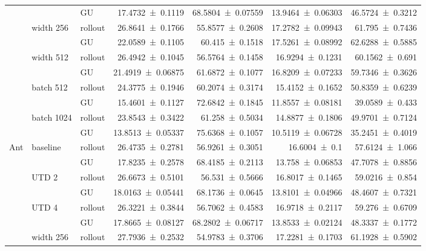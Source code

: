 {\begin{longtable}{@{}lllrrrr@{}}
     &  & GU & \num{17.4732+-0.1119} & \num{68.5804+-0.07559} & \num{13.9464+-0.06303} & \num{46.5724+-0.3212} \\
    \addlinespace[2pt]
     & width 256 & rollout & \num{26.8641+-0.1766} & \num{55.8577+-0.2608} & \num{17.2782+-0.09943} & \num{61.795+-0.7436} \\
     &  & GU & \num{22.0589+-0.1105} & \num{60.415+-0.1518} & \num{17.5261+-0.08992} & \num{62.6288+-0.5885} \\
    \addlinespace[2pt]
     & width 512 & rollout & \num{26.4942+-0.1045} & \num{56.5764+-0.1458} & \num{16.9294+-0.1231} & \num{60.1562+-0.691} \\
     &  & GU & \num{21.4919+-0.06875} & \num{61.6872+-0.1077} & \num{16.8209+-0.07233} & \num{59.7346+-0.3626} \\
    \addlinespace[2pt]
     & batch 512 & rollout & \num{24.3775+-0.1946} & \num{60.2074+-0.3174} & \num{15.4152+-0.1652} & \num{50.8359+-0.6239} \\
     &  & GU & \num{15.4601+-0.1127} & \num{72.6842+-0.1845} & \num{11.8557+-0.08181} & \num{39.0589+-0.433} \\
    \addlinespace[2pt]
     & batch 1024 & rollout & \num{23.8543+-0.3422} & \num{61.258+-0.5034} & \num{14.8877+-0.1806} & \num{49.9701+-0.7124} \\
     &  & GU & \num{13.8513+-0.05337} & \num{75.6368+-0.1057} & \num{10.5119+-0.06728} & \num{35.2451+-0.4019} \\
    \addlinespace[2pt]
    \midrule
    Ant & baseline & rollout & \num{26.4735+-0.2781} & \num{56.9261+-0.3051} & \num{16.6004+-0.1} & \num{57.6124+-1.066} \\
     &  & GU & \num{17.8235+-0.2578} & \num{68.4185+-0.2113} & \num{13.758+-0.06853} & \num{47.7078+-0.8856} \\
    \addlinespace[2pt]
     & UTD 2 & rollout & \num{26.6673+-0.5101} & \num{56.531+-0.5666} & \num{16.8017+-0.1465} & \num{59.0216+-0.854} \\
     &  & GU & \num{18.0163+-0.05441} & \num{68.1736+-0.0645} & \num{13.8101+-0.04966} & \num{48.4607+-0.7321} \\
    \addlinespace[2pt]
     & UTD 4 & rollout & \num{26.3221+-0.3844} & \num{56.7062+-0.4583} & \num{16.9718+-0.2117} & \num{59.276+-0.6709} \\
     &  & GU & \num{17.8665+-0.08127} & \num{68.2802+-0.06717} & \num{13.8533+-0.02124} & \num{48.3337+-0.1772} \\
    \addlinespace[2pt]
     & width 256 & rollout & \num{27.7936+-0.2532} & \num{54.9783+-0.3706} & \num{17.2281+-0.1703} & \num{61.1928+-0.5902} \\

\end{longtable}}
